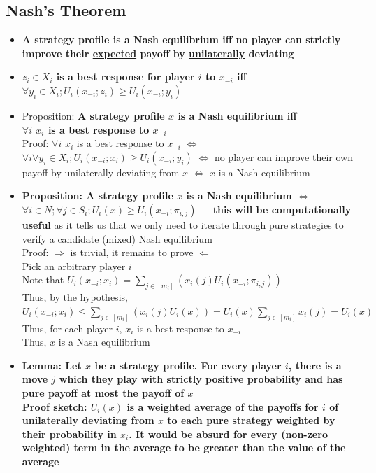 \documentclass[20pt,a4paper,landscape]{extarticle}
\begin{document}
\begin{flushleft}
\subsection{Nash's Theorem}
\begin{itemize}
\item \textbf{A strategy profile is a Nash equilibrium iff no player can strictly improve their \underline{expected} payoff by \underline{unilaterally} deviating}
\item \textbf{\boldmath$z_i \in X_i$ is a best response for player $i$ to $x_{-i}$ iff $\forall y_i \in X_i; U_i(x_{-i};z_i) \geq U_i(x_{-i};y_i)$}
\item Proposition: \textbf{A strategy profile \boldmath$x$ is a Nash equilibrium iff\\
$\forall i$ $x_i$ is a best response to $x_{-i}$}\\
Proof: $\forall i$ $x_i$ is a best response to $x_{-i}$ $\Leftrightarrow$ $\forall i \forall y_i \in X_i; U_i(x_{-i};x_i) \geq U_i(x_{-i};y_i)$ $\Leftrightarrow$ no player can improve their own payoff by unilaterally deviating from $x$ $\Leftrightarrow$ $x$ is a Nash equilibrium
\item \textbf{Proposition: A strategy profile \boldmath$x$ is a Nash equilibrium $\Leftrightarrow$ $\forall i \in N; \forall j \in S_i; U_i(x) \geq U_i(x_{-i}; \pi_{i,j})$} --- \textbf{this will be computationally useful} as it tells us that we only need to iterate through pure strategies to verify a candidate (mixed) Nash equilibrium\\
Proof: $\Rightarrow$ is trivial, it remains to prove $\Leftarrow$\\
Pick an arbitrary player $i$\\
Note that $U_i(x_{-i};x_i) = \sum_{j \in [m_i]} \left(x_i(j)U_i(x_{-i};\pi_{i,j})\right)$\\
Thus, by the hypothesis, $U_i(x_{-i};x_i) \leq \sum_{j \in [m_i]} \left(x_i(j)U_i(x)\right) = U_i(x)\sum_{j \in [m_i]} x_i(j) = U_i(x)$\\
Thus, for each player $i$, $x_i$ is a best response to $x_{-i}$\\
Thus, $x$ is a Nash equilibrium
\clearpage
\item \textbf{Lemma: Let \boldmath$x$ be a strategy profile. For every player $i$, there is a move $j$ which they play with strictly positive probability and has pure payoff at most the payoff of $x$}\\
\textbf{Proof sketch: \boldmath$U_i(x)$ is a weighted average of the payoffs for $i$ of unilaterally deviating from $x$ to each pure strategy weighted by their probability in $x_i$. It would be absurd for every (non-zero weighted) term in the average to be greater than the value of the average}

\end{itemize}
\end{flushleft}
\end{document}
